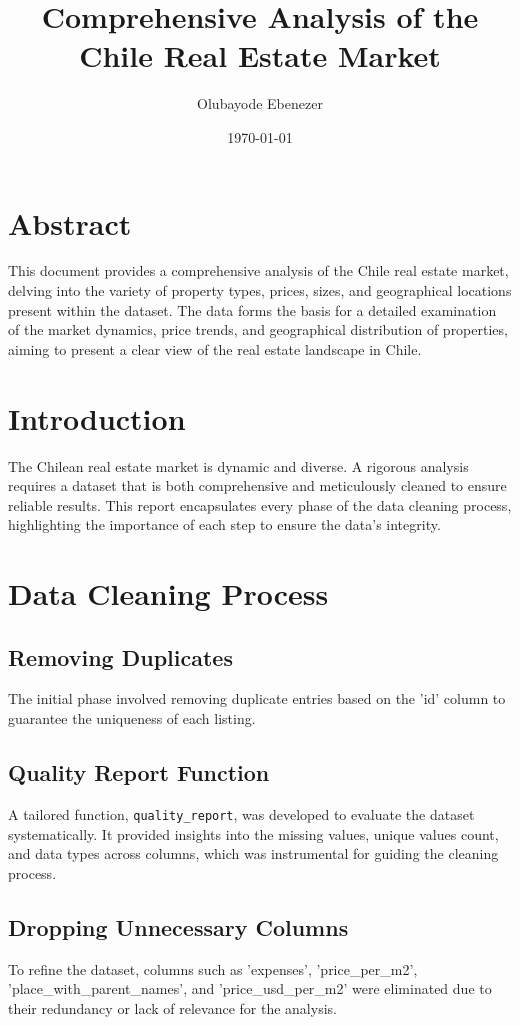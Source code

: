 \documentclass{article}
\title{Comprehensive Analysis of the Chile Real Estate Market}
\author{Olubayode Ebenezer}
\date{\today}
\begin{document}
\maketitle

\section*{Abstract}
This document provides a comprehensive analysis of the Chile real estate market, delving into the variety of property types, prices, sizes, and geographical locations present within the dataset. The data forms the basis for a detailed examination of the market dynamics, price trends, and geographical distribution of properties, aiming to present a clear view of the real estate landscape in Chile.

\section{Introduction}
The Chilean real estate market is dynamic and diverse. A rigorous analysis requires a dataset that is both comprehensive and meticulously cleaned to ensure reliable results. This report encapsulates every phase of the data cleaning process, highlighting the importance of each step to ensure the data's integrity.

\section{Data Cleaning Process}
\subsection{Removing Duplicates}
The initial phase involved removing duplicate entries based on the 'id' column to guarantee the uniqueness of each listing.

\subsection{Quality Report Function}
A tailored function, \texttt{quality\_report}, was developed to evaluate the dataset systematically. It provided insights into the missing values, unique values count, and data types across columns, which was instrumental for guiding the cleaning process.

\subsection{Dropping Unnecessary Columns}
To refine the dataset, columns such as 'expenses', 'price\_per\_m2', 'place\_with\_parent\_names', and 'price\_usd\_per\_m2' were eliminated due to their redundancy or lack of relevance for the analysis.
\end{document}
